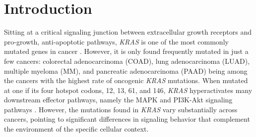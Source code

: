 \documentclass[english, 12pt, letterpaper]{article}
\newcommand{\KRAS}{\emph{KRAS}}
\begin{document}
\section*{Introduction}

Sitting at a critical signaling junction between extracellular growth receptors and pro-growth, anti-apoptotic pathways, \KRAS{} is one of the most commonly mutated genes in cancer \cite{Barbacid1987, Bailey2018}.
However, it is only found frequently mutated in just a few cancers: colorectal adenocarcinoma (COAD), lung adenocarcinoma (LUAD), multiple myeloma (MM), and pancreatic adenocarcinoma (PAAD) being among the cancers with the highest rate of oncogenic \KRAS{} mutations.
When mutated at one if its four hotspot codons, 12, 13, 61, and 146, \KRAS{} hyperactivates many downstream effector pathways, namely the MAPK and PI3K-Akt signaling pathways \cite{Simanshu2017}.
However, the mutations found in \KRAS{} vary substantially across cancers, pointing to significant differences in signaling behavior that complement the environment of the specific cellular context.
\end{document}
